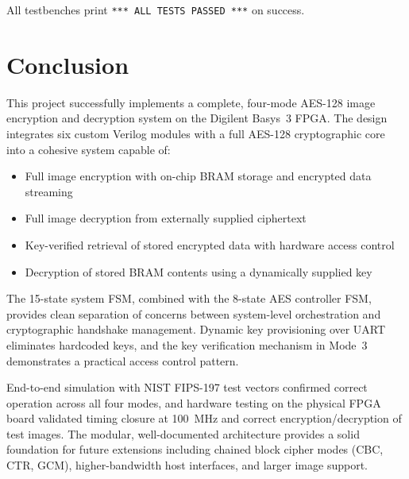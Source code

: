 \documentclass[12pt,a4paper]{article}
\begin{document}
All testbenches print \texttt{*** ALL TESTS PASSED ***} on success.


\section{Conclusion}

This project successfully implements a complete, four-mode AES-128 image encryption and decryption system on the Digilent Basys~3 FPGA. The design integrates six custom Verilog modules with a full AES-128 cryptographic core into a cohesive system capable of:
\begin{itemize}
    \item Full image encryption with on-chip BRAM storage and encrypted data streaming
    \item Full image decryption from externally supplied ciphertext
    \item Key-verified retrieval of stored encrypted data with hardware access control
    \item Decryption of stored BRAM contents using a dynamically supplied key
\end{itemize}

The 15-state system FSM, combined with the 8-state AES controller FSM, provides clean separation of concerns between system-level orchestration and cryptographic handshake management. Dynamic key provisioning over UART eliminates hardcoded keys, and the key verification mechanism in Mode~3 demonstrates a practical access control pattern.

End-to-end simulation with NIST FIPS-197 test vectors confirmed correct operation across all four modes, and hardware testing on the physical FPGA board validated timing closure at 100~MHz and correct encryption/decryption of test images. The modular, well-documented architecture provides a solid foundation for future extensions including chained block cipher modes (CBC, CTR, GCM), higher-bandwidth host interfaces, and larger image support.
\end{document}
